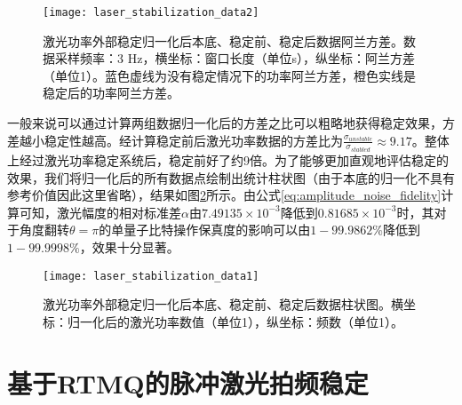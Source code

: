 \begin{figure}
    \centering
    \caption[激光功率外部稳定阿兰方差对比数据]{激光功率外部稳定归一化后本底、稳定前、稳定后数据阿兰方差。数据采样频率：3 Hz，横坐标：窗口长度（单位s），纵坐标：阿兰方差（单位1）。蓝色虚线为没有稳定情况下的功率阿兰方差，橙色实线是稳定后的功率阿兰方差。\label{fig:laser_stabilization_data2}}
    \texttt{[image: laser\_stabilization\_data2]}
\end{figure}

一般来说可以通过计算两组数据归一化后的方差之比可以粗略地获得稳定效果，方差越小稳定性越高。经计算稳定前后激光功率数据的方差比为$\frac{\sigma_{unstable}}{\sigma_{stabled}}\approx 9.17$。整体上经过激光功率稳定系统后，稳定前好了约9倍。为了能够更加直观地评估稳定的效果，我们将归一化后的所有数据点绘制出统计柱状图（由于本底的归一化不具有参考价值因此这里省略），结果如图\ref{fig:laser_stabilization_data1}所示。由公式\eqref{eq:amplitude_noise_fidelity}计算可知，激光幅度的相对标准差$\alpha$由$7.49135\times 10^{-3}$降低到$0.81685\times 10^{-3}$时，其对于角度翻转$\theta=\pi$的单量子比特操作保真度的影响可以由$1-99.9862\%$降低到$1-99.9998\%$，效果十分显著。


\begin{figure}
    \centering
    \caption[激光功率外部稳定柱状图对比数据]{激光功率外部稳定归一化后本底、稳定前、稳定后数据柱状图。横坐标：归一化后的激光功率数值（单位1），纵坐标：频数（单位1）。\label{fig:laser_stabilization_data1}}
    \texttt{[image: laser\_stabilization\_data1]}
\end{figure}












\newpage
\section[基于RTMQ的脉冲激光拍频稳定]{基于RTMQ的脉冲激光拍频稳定\label{section:pulsed_laser_locking}}

